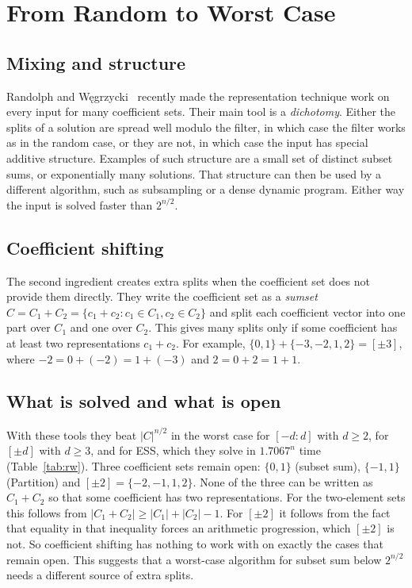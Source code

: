 \documentclass[11pt]{article}
\begin{document}
\section{From Random to Worst Case}\label{sec:rw}

\subsection{Mixing and structure}
Randolph and W\k{e}grzycki~\cite{rw} recently made the representation technique
work on every input for many coefficient sets. Their main tool is a
\emph{dichotomy}. Either the splits of a solution are spread well modulo the
filter, in which case the filter works as in the random case, or they are not,
in which case the input has special additive structure. Examples of such
structure are a small set of distinct subset sums, or exponentially many
solutions. That structure can then be used by a different algorithm, such as
subsampling or a dense dynamic program. Either way the input is solved faster
than $2^{n/2}$.

\subsection{Coefficient shifting}
The second ingredient creates extra splits when the coefficient set does not
provide them directly. They write the coefficient set as a \emph{sumset}
$C=C_1+C_2=\{c_1+c_2:c_1\in C_1,c_2\in C_2\}$ and split each coefficient vector
into one part over $C_1$ and one over $C_2$. This gives many splits only if some
coefficient has at least two representations $c_1+c_2$. For example,
$\{0,1\}+\{-3,-2,1,2\}=[\pm3]$, where $-2=0+(-2)=1+(-3)$ and $2=0+2=1+1$.

\subsection{What is solved and what is open}
With these tools they beat $|C|^{n/2}$ in the worst case for $[-d:d]$ with
$d\ge2$, for $[\pm d]$ with $d\ge3$, and for ESS, which they solve in
$1.7067^n$ time (Table~\ref{tab:rw}). Three coefficient sets remain open:
$\{0,1\}$ (subset sum), $\{-1,1\}$ (Partition) and $[\pm2]=\{-2,-1,1,2\}$. None
of the three can be written as $C_1+C_2$ so that some coefficient has two
representations. For the two-element sets this follows from
$|C_1+C_2|\ge|C_1|+|C_2|-1$. For $[\pm2]$ it follows from the fact that equality
in that inequality forces an arithmetic progression, which $[\pm2]$ is not. So
coefficient shifting has nothing to work with on exactly the cases that remain
open. This suggests that a worst-case algorithm for subset sum below $2^{n/2}$
needs a different source of extra splits.
\end{document}
